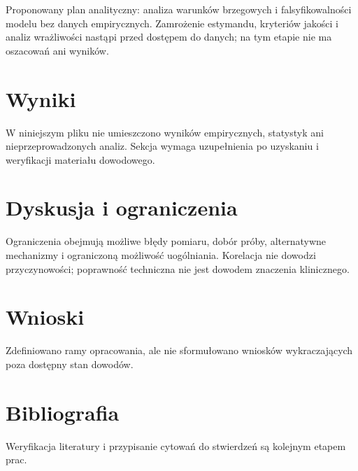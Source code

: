\documentclass[11pt,a4paper]{article}
\begin{document}
Proponowany plan analityczny: analiza warunków brzegowych i falsyfikowalności modelu bez danych empirycznych. Zamrożenie estymandu, kryteriów jakości i analiz wrażliwości nastąpi przed dostępem do danych; na tym etapie nie ma oszacowań ani wyników.

\section{Wyniki}

W niniejszym pliku nie umieszczono wyników empirycznych, statystyk ani nieprzeprowadzonych analiz. Sekcja wymaga uzupełnienia po uzyskaniu i weryfikacji materiału dowodowego.

\section{Dyskusja i ograniczenia}

Ograniczenia obejmują możliwe błędy pomiaru, dobór próby, alternatywne mechanizmy i ograniczoną możliwość uogólniania. Korelacja nie dowodzi przyczynowości; poprawność techniczna nie jest dowodem znaczenia klinicznego.

\section{Wnioski}

Zdefiniowano ramy opracowania, ale nie sformułowano wniosków wykraczających poza dostępny stan dowodów.

\section*{Bibliografia}

Weryfikacja literatury i przypisanie cytowań do stwierdzeń są kolejnym etapem prac.
\end{document}
